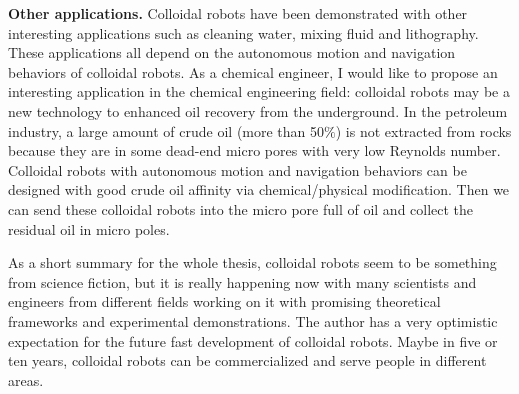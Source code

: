 \textbf{Other applications.} Colloidal robots have been demonstrated with other interesting applications such as cleaning water, mixing fluid and lithography\autocite{soler2014catalytic,fei2019magneto,li2014nanomotor}. These applications all depend on the autonomous motion and navigation behaviors of colloidal robots. As a chemical engineer, I would like to propose an interesting application in the chemical engineering field: colloidal robots may be a new technology to enhanced oil recovery from the underground. In the petroleum industry, a large amount of crude oil (more than 50$\%$) is not extracted from rocks because they are in some dead-end micro pores with very low Reynolds number. Colloidal robots with autonomous motion and navigation behaviors can be designed with good crude oil affinity via chemical/physical modification. Then we can send these colloidal robots into the micro pore full of oil and collect the residual oil in micro poles.

As a short summary for the whole thesis, colloidal robots seem to be something from science fiction, but it is really happening now with many scientists and engineers from different fields working on it with promising theoretical frameworks and experimental demonstrations. The author has a very optimistic expectation for the future fast development of colloidal robots. Maybe in five or ten years, colloidal robots can be commercialized and serve people in different areas.  


